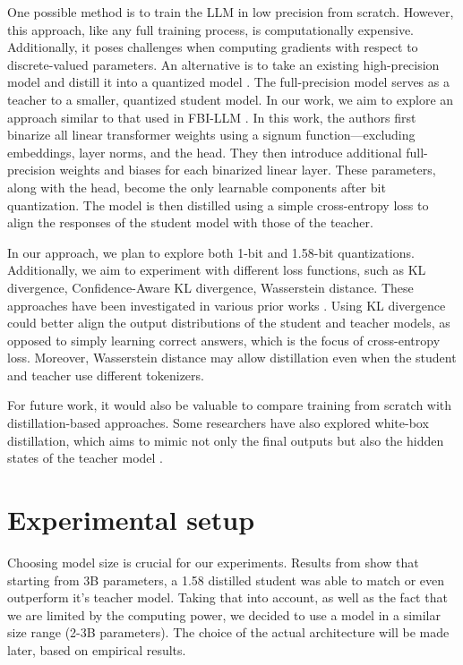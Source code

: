 \documentclass{article}
\begin{document}
One possible method is to train the LLM in low precision from scratch. However, this approach, like any full training process, is
computationally expensive. Additionally, it poses challenges when computing gradients with respect to discrete-valued parameters.
An alternative is to take an existing high-precision model and distill it into a quantized model
\cite{du2024bitdistillerunleashingpotentialsub4bit}. The full-precision model serves as a teacher to a smaller, quantized student model. 
In our work, we aim to explore an approach similar to that used in FBI-LLM \cite{fbillm}. In this work, the authors first binarize all 
linear transformer weights using a signum function—excluding embeddings, layer norms, and the head. They then introduce additional 
full-precision weights and biases for each binarized linear layer. These parameters, along with the head, become the only learnable 
components after bit quantization. The model is then distilled using a simple cross-entropy loss to align the responses of the student 
model with those of the teacher.

In our approach, we plan to explore both 1-bit and 1.58-bit quantizations. Additionally, we aim to experiment with different loss 
functions, such as KL divergence, Confidence-Aware KL divergence, Wasserstein distance. These approaches have been investigated in various
prior works \cite{du2024bitdistillerunleashingpotentialsub4bit, boizard2025crosstokenizerdistillationuniversallogit}. Using KL divergence 
could better align the output distributions of the student and teacher models, as opposed to simply learning correct answers, which is 
the focus of cross-entropy loss. Moreover, Wasserstein distance may allow distillation even when the student and teacher use different tokenizers.

For future work, it would also be valuable to compare training from scratch with distillation-based approaches. Some researchers 
have also explored white-box distillation, which aims to mimic not only the final outputs but also the hidden states of the teacher 
model \cite{gu2024minillmknowledgedistillationlarge}.

\section{Experimental setup}

Choosing model size is crucial for our experiments. Results from \cite{ma2024era1bitllmslarge} show that starting from 3B parameters, a 1.58 distilled student was able to match or even outperform it's teacher model. Taking that into account, as well as the fact that we are limited by the computing power, we decided to use a model in a similar size range (2-3B parameters). The choice of the actual architecture will be made later, based on empirical results.
\end{document}
